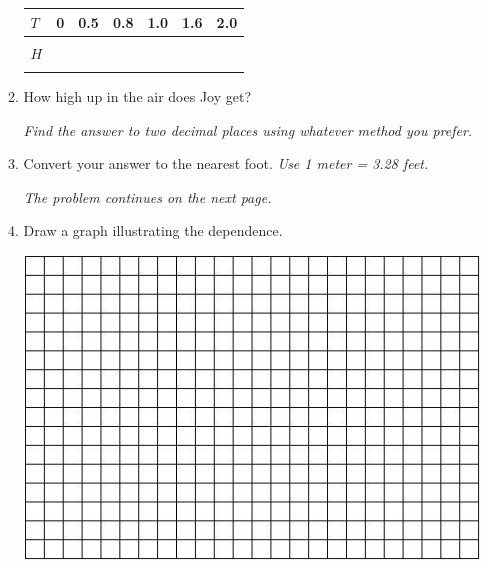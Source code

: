 \documentclass[12pt]{article}
\begin{document}
\begin{enumerate}
\begin{enumerate}
\begin{center}
\begin{tabular} {|l|c|c|c|c|c|c|} \hline
$T$ & 0 & 0.5 & 0.8 & 1.0 & 1.6 & 2.0 \\ \hline
&&&&&& \\
$H$ & \hspace{.7in} & \hspace{.7in}  & \hspace{.7in}  & \hspace{.7in}  & \hspace{.7in}  & \hspace{.7in}  \\
&&&&&& \\ \hline
\end{tabular}
\end{center}

\item How high up in the air does Joy get?

\emph{Find the answer to two decimal places using whatever method you prefer.}
\vfill
\vfill

\item Convert your answer to the nearest foot.  \emph{Use 1 meter = 3.28 feet.}
\vfill

\hspace{-.5in} \emph{The problem continues on the next page.}

\newpage %

\item Draw a graph illustrating the dependence.

\vspace{.1in}
\begin{center}
 {\includegraphics [width = 6in] {../GraphPaper}}
\end{center}
\vspace{.1in}


\end{enumerate}
\end{enumerate}
\end{document}
